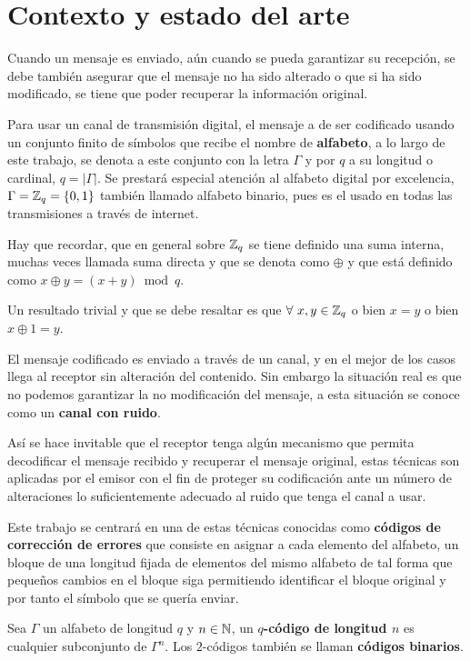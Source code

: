 \section{Contexto y estado del arte}

Cuando un mensaje es enviado, aún cuando se pueda garantizar su recepción, se debe también asegurar que el mensaje no ha sido alterado o que si ha sido modificado, se tiene que poder recuperar la información original.

Para usar un canal de transmisión digital, el mensaje a de ser codificado usando un conjunto finito de símbolos que recibe el nombre de \textbf{alfabeto}, a lo largo de este trabajo, se denota a este conjunto con la letra $\Gamma$ y por $q$ a su longitud o cardinal, $q=|\Gamma|$.
Se prestará especial atención al alfabeto digital por excelencia, $\Gamma = \mathbb{Z}_q = \left\{0, 1\right\}$ también llamado alfabeto binario, pues es el usado en todas las transmisiones a través de internet.

Hay que recordar, que en general sobre $\mathbb{Z}_q$ se tiene definido una suma interna, muchas veces llamada suma directa y que se denota como $\oplus$ y que está definido como $x\oplus y = (x+y)\bmod q$.

Un resultado trivial y que se debe resaltar es que $\forall\ x,y\in\mathbb{Z}_q$ o bien $x=y$ o bien $x\oplus 1=y$.

El mensaje codificado es enviado a través de un canal, y en el mejor de los casos llega al receptor sin alteración del contenido.
Sin embargo la situación real es que no podemos garantizar la no modificación del mensaje, a esta situación se conoce como un \textbf{canal con ruido}.

Así se hace invitable que el receptor tenga algún mecanismo que permita decodificar el mensaje recibido y recuperar el mensaje original, estas técnicas son aplicadas por el emisor con el fin de proteger su codificación ante un número de alteraciones lo suficientemente adecuado al ruido que tenga el canal a usar.

Este trabajo se centrará en una de estas técnicas conocidas como \textbf{códigos de corrección de errores} que consiste en asignar a cada elemento del alfabeto, un bloque de una longitud fijada de elementos del mismo alfabeto de tal forma que pequeños cambios en el bloque siga permitiendo identificar el bloque original y por tanto el símbolo que se quería enviar.

\begin{definition}
	Sea $\Gamma$ un alfabeto de longitud $q$ y $n\in\mathbb{N}$, un \textbf{$q$-código de longitud $n$} es cualquier subconjunto de $\Gamma^n$.
	Los $2$-códigos también se llaman \textbf{códigos binarios}.
\end{definition}

